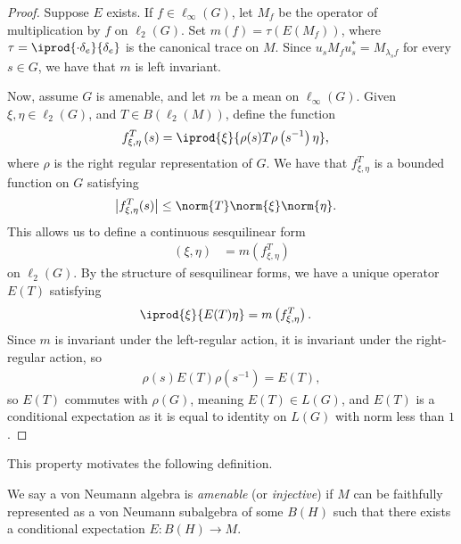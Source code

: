 \documentclass[10pt]{mypackage}
\begin{document}
\begin{proof}
  Suppose $E$ exists. If $f\in \ell_{\infty}\left( G \right)$, let $M_f$ be the operator of multiplication by $f$ on $\ell_2\left( G \right)$. Set $m(f) = \tau\left( E\left( M_f \right) \right)$, where $\tau = \iprod{\cdot\delta_e}{\delta_e}$ is the canonical trace on $M$. Since $u_sM_fu_s^{\ast} = M_{\lambda_s f}$ for every $s\in G$, we have that $m$ is left invariant.

  Now, assume $G$ is amenable, and let $m$ be a mean on $\ell_{\infty}\left( G \right)$. Given $\xi,\eta\in \ell_2\left( G \right)$, and $T\in B\left( \ell_2\left( M \right) \right)$, define the function
  \begin{align*}
    f_{\xi,\eta}^{T}\left( s \right) &= \iprod{\xi}{\rho(s)T\rho\left( s^{-1} \right)\eta},
  \end{align*}
  where $\rho$ is the right regular representation of $G$. We have that $f_{\xi,\eta}^{T}$ is a bounded function on $G$ satisfying
  \begin{align*}
    \left\vert f_{\xi,\eta}^{T}(s) \right\vert &\leq \norm{T}\norm{\xi}\norm{\eta}.
  \end{align*}
  This allows us to define a continuous sesquilinear form
  \begin{align*}
    \left( \xi,\eta \right) &= m\left( f_{\xi,\eta}^{T} \right)
  \end{align*}
  on $\ell_2\left( G \right)$. By the structure of sesquilinear forms, we have a unique operator $E(T)$ satisfying
  \begin{align*}
    \iprod{\xi}{E(T)\eta} &= m\left( f_{\xi,\eta}^{T} \right).
  \end{align*}
  Since $m$ is invariant under the left-regular action, it is invariant under the right-regular action, so 
  \begin{align*}
    \rho(s)E(T)\rho\left( s^{-1} \right) = E(T),
  \end{align*}
  so $E(T)$ commutes with $\rho(G)$, meaning $E(T)\in L(G)$, and $E(T)$ is a conditional expectation as it is equal to identity on $L(G)$ with norm less than $1$.
\end{proof}
This property motivates the following definition.
\begin{definition}
  We say a von Neumann algebra is \textit{amenable} (or \textit{injective}) if $M$ can be faithfully represented as a von Neumann subalgebra of some $B\left( H \right)$ such that there exists a conditional expectation $E\colon B\left( H \right)\rightarrow M$.
\end{definition}
\end{document}
